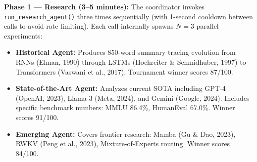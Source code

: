 \documentclass[a4paper,12pt,openany]{report}
\begin{document}
\textbf{Phase 1 --- Research (3--5 minutes):} The coordinator invokes \texttt{run\_research\_agent()} three times sequentially (with 1-second cooldown between calls to avoid rate limiting). Each call internally spawns $N=3$ parallel experiments:

\begin{itemize}[leftmargin=2cm]
\item \textbf{Historical Agent:} Produces 850-word summary tracing evolution from RNNs (Elman, 1990) through LSTMs (Hochreiter \& Schmidhuber, 1997) to Transformers (Vaswani et al., 2017). Tournament winner scores 87/100.
\item \textbf{State-of-the-Art Agent:} Analyzes current SOTA including GPT-4 (OpenAI, 2023), Llama-3 (Meta, 2024), and Gemini (Google, 2024). Includes specific benchmark numbers: MMLU 86.4\%, HumanEval 67.0\%. Winner scores 91/100.
\item \textbf{Emerging Agent:} Covers frontier research: Mamba (Gu \& Dao, 2023), RWKV (Peng et al., 2023), Mixture-of-Experts routing. Winner scores 84/100.
\end{itemize}
\end{document}
